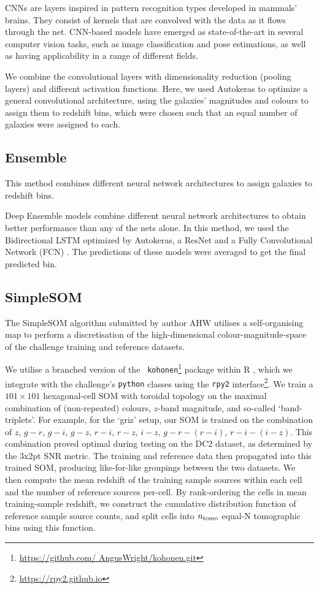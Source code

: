 \documentclass[twocolumn,twocolappendix]{aastex63}
\begin{document}
CNNs \citep{lecun2015deep} are layers inspired in pattern recognition types developed in mammals' brains.
They consist of kernels that are convolved with the data as it flows through the net. CNN-based
models have emerged as state-of-the-art in several computer vision tasks, such as image
classification and pose estimations, as well as having applicability in a range of different fields.
 
We combine the convolutional layers with dimensionality reduction (pooling layers) and different
activation functions. Here, we used Autokeras to optimize a general convolutional architecture,
using the galaxies' magnitudes and colours to assign them to redshift bins, which were chosen such
that an equal number of galaxies were assigned to each.


\subsection{ {\sc Ensemble} } 
\label{ClecioEnsemble} 
This method combines different neural network
architectures to assign galaxies to redshift bins.
 
Deep Ensemble models combine different neural network architectures to obtain better performance
than any of the nets alone. In this method, we used the Bidirectional LSTM optimized by Autokeras, a
ResNet \citep{resnet} and a Fully Convolutional Network (FCN) \citep{fcn}. The predictions of these
models were averaged to get the final predicted bin. 
 


\subsection{ {\sc SimpleSOM} }
The SimpleSOM algorithm submitted by author AHW utilises a self-organising map
\citep[SOM,][]{Kohonen:1982} to perform  a discretisation of the
high-dimensional colour-magnitude-space of the challenge training and reference
datasets. 

We utilise a branched version of the {\tt
kohonen}\footnote{\url{https://github.com/ AngusWright/kohonen.git}} package
\citep{Wright/etal:2020b, Wehrens/Kruisselbrink:2018, Wehrens/Lutgarde:2007}
within R \citep{R}, which we integrate with  the challenge's {\tt python}
classes using the {\tt rpy2} interface\footnote{\url{https://rpy2.github.io}}. 
We train a $101 \times 101$ hexagonal-cell SOM with toroidal topology on the
maximal combination of (non-repeated) colours, $z$-band magnitude, and so-called
`band-triplets'. For example, for the `griz' setup, our SOM is trained on the
combination of  $z$, $g-r$, $g-i$, $g-z$, $r-i$, $r-z$, $i-z$, $g-r-(r-i)$,
$r-i-(i-z)$. This combination proved optimal during testing on the DC2 dataset,
as determined by the 3x2pt SNR metric. The training and reference data then
propagated into this trained SOM, producing like-for-like groupings between the
two datasets. We then compute the mean redshift of the training sample sources
within each cell and the number of reference sources per-cell. By rank-ordering
the cells in mean training-sample redshift, we construct the cumulative
distribution function of reference sample source counts, and split cells into
${n_{\rm tomo}}$ equal-N tomographic bins using this function. 
\end{document}
